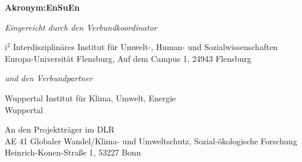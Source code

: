 \begin{center}
{\textbf{\textsf{}}
}

{\Huge
\textbf{\textsf{Akronym:{EnSuEn}}}
}

\vspace{1cm}

\textit{Eingereicht durch den Verbundkoordinator}

{\parskip 0pt
i$^{2}$ Interdisziplinäres Institut für Umwelt-, Human- und Sozialwissenschaften\\
Europa-Universität Flensburg, Auf dem Campus 1, 24943 Flensburg}

\vspace{0.3cm}

\textit{und den Verbundpartner}

{\parskip 0pt
Wuppertal Institut für Klima, Umwelt, Energie\\
Wuppertal}

\vspace{0.5cm}

An den Projektträger im DLR \\
AE 41 Globaler Wandel/Klima- und Umweltschutz, Sozial-ökologische Forschung \\
Heinrich-Konen-Straße 1, 53227 Bonn


\end{center}

\clearpage